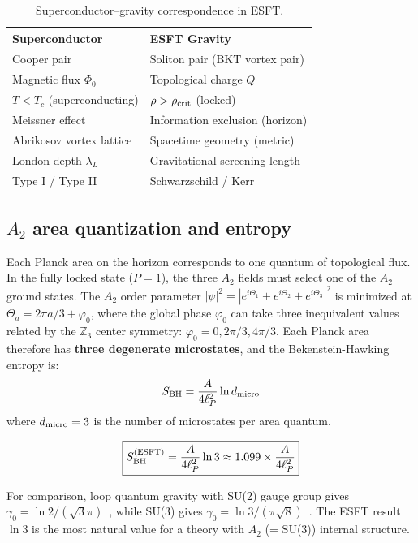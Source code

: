 ﻿\documentclass[twocolumn,preprintnumbers,amsmath,amssymb,prd]{revtex4-2}
\begin{document}
\begin{table}[h]
\caption{Superconductor--gravity correspondence in ESFT.}
\label{tab:analogy}
\begin{ruledtabular}
\begin{tabular}{ll}
Superconductor & ESFT Gravity \\
\hline
Cooper pair & Soliton pair (BKT vortex pair) \\
Magnetic flux $\Phi_0$ & Topological charge $Q$ \\
$T < T_c$ (superconducting) & $\rho > \rho_{\rm crit}$ (locked) \\
Meissner effect & Information exclusion (horizon) \\
Abrikosov vortex lattice & Spacetime geometry (metric) \\
London depth $\lambda_L$ & Gravitational screening length \\
Type I / Type II & Schwarzschild / Kerr \\
\end{tabular}
\end{ruledtabular}
\end{table}

\subsection{$A_2$ area quantization and entropy}

Each Planck area on the horizon corresponds to one quantum of topological flux. In the fully locked state ($P=1$), the three $A_2$ fields must select one of the $A_2$ ground states. The $A_2$ order parameter $|\psi|^2 = |e^{i\Theta_1} + e^{i\Theta_2} + e^{i\Theta_3}|^2$ is minimized at $\Theta_a = 2\pi a/3 + \varphi_0$, where the global phase $\varphi_0$ can take three inequivalent values related by the $\mathbb{Z}_3$ center symmetry: $\varphi_0 = 0, 2\pi/3, 4\pi/3$. Each Planck area therefore has \textbf{three degenerate microstates}, and the Bekenstein-Hawking entropy is:
\begin{equation}
S_{\rm BH} = \frac{A}{4\ell_P^2}\ln d_{\rm micro}
\label{eq:SBH}
\end{equation}
where $d_{\rm micro} = 3$ is the number of microstates per area quantum.

\begin{equation}
\boxed{S_{\rm BH}^{(\rm ESFT)} = \frac{A}{4\ell_P^2}\ln 3 \approx 1.099 \times \frac{A}{4\ell_P^2}}
\label{eq:S_ESFT}
\end{equation}

For comparison, loop quantum gravity with SU(2) gauge group gives $\gamma_0 = \ln 2/(\sqrt{3}\pi)$~\cite{Ashtekar1998}, while SU(3) gives $\gamma_0 = \ln 3/(\pi\sqrt{8})$~\cite{Meissner2004}. The ESFT result $\ln 3$ is the most natural value for a theory with $A_2$ (= SU(3)) internal structure.
\end{document}
